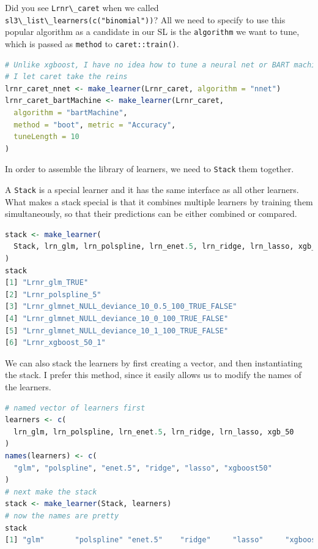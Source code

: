 \documentclass[
  12pt, krantz2,
]{krantz}
\newcommand{\passthrough}[1]{#1}
\theoremstyle{definition}
\theoremstyle{definition}
\theoremstyle{definition}
\newcommand{\1}{\mathbbm{1}}
\begin{document}
Did you see \passthrough{\lstinline!Lrnr\_caret!} when we called \passthrough{\lstinline!sl3\_list\_learners(c("binomial"))!}? All
we need to specify to use this popular algorithm as a candidate in our SL is
the \passthrough{\lstinline!algorithm!} we want to tune, which is passed as \passthrough{\lstinline!method!} to \passthrough{\lstinline!caret::train()!}.

\begin{lstlisting}[language=R]
# Unlike xgboost, I have no idea how to tune a neural net or BART machine, so
# I let caret take the reins
lrnr_caret_nnet <- make_learner(Lrnr_caret, algorithm = "nnet")
lrnr_caret_bartMachine <- make_learner(Lrnr_caret,
  algorithm = "bartMachine",
  method = "boot", metric = "Accuracy",
  tuneLength = 10
)
\end{lstlisting}

In order to assemble the library of learners, we need to \passthrough{\lstinline!Stack!} them
together.

A \passthrough{\lstinline!Stack!} is a special learner and it has the same interface as all other
learners. What makes a stack special is that it combines multiple learners by
training them simultaneously, so that their predictions can be either combined
or compared.

\begin{lstlisting}[language=R]
stack <- make_learner(
  Stack, lrn_glm, lrn_polspline, lrn_enet.5, lrn_ridge, lrn_lasso, xgb_50
)
stack
[1] "Lrnr_glm_TRUE"                                  
[2] "Lrnr_polspline_5"                               
[3] "Lrnr_glmnet_NULL_deviance_10_0.5_100_TRUE_FALSE"
[4] "Lrnr_glmnet_NULL_deviance_10_0_100_TRUE_FALSE"  
[5] "Lrnr_glmnet_NULL_deviance_10_1_100_TRUE_FALSE"  
[6] "Lrnr_xgboost_50_1"                              
\end{lstlisting}

We can also stack the learners by first creating a vector, and then
instantiating the stack. I prefer this method, since it easily allows us to
modify the names of the learners.

\begin{lstlisting}[language=R]
# named vector of learners first
learners <- c(
  lrn_glm, lrn_polspline, lrn_enet.5, lrn_ridge, lrn_lasso, xgb_50
)
names(learners) <- c(
  "glm", "polspline", "enet.5", "ridge", "lasso", "xgboost50"
)
# next make the stack
stack <- make_learner(Stack, learners)
# now the names are pretty
stack
[1] "glm"       "polspline" "enet.5"    "ridge"     "lasso"     "xgboost50"
\end{lstlisting}
\end{document}

